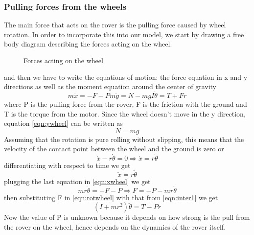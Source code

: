 \documentclass{article}
\begin{document}
	\subsubsection{Pulling forces from the wheels}
	The main force that acts on the rover is the pulling force caused by wheel rotation. In order to incorporate this into our model, we start by drawing a free body diagram describing the forces acting on the wheel.
	\begin{figure}[H]
		\centering
		\def\svgwidth{150pt}
		
		\caption{Forces acting on the wheel}
		\label{fig:wheel}
	\end{figure}
	and then we have to write the equations of motion: the force equation in x and y directions as well as the moment equation around the center of gravity
	\begin{subequations}
		\begin{equation}
		m\ddot{x} = -F-P
		\label{eqn:xwheel}
		\end{equation}
		\begin{equation}
		m\ddot{y} = N - mg 
		\label{eqn:ywheel}
		\end{equation}
		\begin{equation}
		I\ddot{\theta} = T +Fr
		\label{eqn:rotwheel}
		\end{equation}
	\end{subequations}
	where P is the pulling force from the rover, F is the friction with the ground and T is the torque from the motor. Since the wheel doesn't move in the y direction, equation \ref{eqn:ywheel} can be written as
	\[N = mg
	\]Assuming that the rotation is pure rolling without slipping, this means that the velocity of the contact point between the wheel and the ground is zero or
	\begin{equation*}
	\dot{x} - r\dot{\theta} = 0 \Rightarrow \dot{x} = r\dot{\theta}
	\end{equation*}
	differentiating with respect to time we get
	\begin{equation}
	\ddot{x} = r\ddot{\theta}
	\end{equation}
	plugging the last equation in \ref{eqn:xwheel} we get
	\begin{equation}
	mr\ddot{\theta} = -F-P \Rightarrow F = -P-mr\ddot{\theta}
	\label{eqn:inter1}
	\end{equation}
	then substituting F in \ref{eqn:rotwheel} with that from \ref{eqn:inter1} we get
	\begin{equation}
	\left(I + mr^2\right)\ddot{\theta} = T-Pr
	\end{equation}
	 Now the value of P is unknown because it depends on how strong is the pull from the rover on the wheel, hence depends on the dynamics of the rover itself. 
	 
\end{document}

